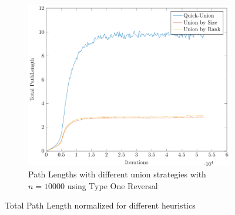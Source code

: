 \begin{figure}[ht]
\begin{subfigure}{0.32\textwidth}
    \end{subfigure}%
    \hfill
    \begin{subfigure}{0.32\textwidth}
        \centering
        \includegraphics[width=\textwidth]{../images/plotTORFull10000_PathLength.pdf}
        \caption{Path Lengths with different union strategies with $n = 10000$ using Type One Reversal}
    \end{subfigure}

    \caption{Total Path Length normalized for different heuristics}
    \label{fig:tplH}
\end{figure}

